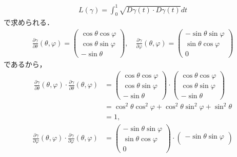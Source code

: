 \documentclass{ltjsbook}
\begin{document}
\begin{specialexample}
\begin{align*}
    L(\gamma) = \int_0^1 \sqrt{D\gamma(t) \cdot D\gamma(t)} dt
\end{align*}
で求められる．
\begin{align*}
    \frac{\partial \gamma}{\partial \theta}(\theta, \varphi)
    =
    \begin{pmatrix}
        \cos \theta \cos \varphi \\
        \cos \theta \sin \varphi \\
        - \sin \theta
    \end{pmatrix},
    \quad
    \frac{\partial \gamma}{\partial \varphi}(\theta, \varphi)
    =
    \begin{pmatrix}
        - \sin \theta \sin \varphi \\
        \sin \theta \cos \varphi \\
        0
    \end{pmatrix}
\end{align*}
であるから，
\begin{align*}
    \frac{\partial \gamma}{\partial \theta}(\theta, \varphi)
    \cdot
    \frac{\partial \gamma}{\partial \theta}(\theta, \varphi)
    &=
    \begin{pmatrix}
        \cos \theta \cos \varphi \\
        \cos \theta \sin \varphi \\
        - \sin \theta
    \end{pmatrix}
    \cdot
    \begin{pmatrix}
        \cos \theta \cos \varphi \\
        \cos \theta \sin \varphi \\
        - \sin \theta
    \end{pmatrix} \\
    &= \cos^2 \theta \cos^2 \varphi
        + \cos^2 \theta \sin^2 \varphi
        + \sin^2 \theta \\
    &= 1,
\end{align*}
\begin{align*}
    \frac{\partial \gamma}{\partial \varphi}(\theta, \varphi)
    \cdot
    \frac{\partial \gamma}{\partial \varphi}(\theta, \varphi)
    &=
    \begin{pmatrix}
        - \sin \theta \sin \varphi \\
        \sin \theta \cos \varphi \\
        0
    \end{pmatrix}
    \cdot
    \begin{pmatrix}
        - \sin \theta \sin \varphi \\

\end{pmatrix}
\end{align*}
\end{specialexample}
\end{document}
